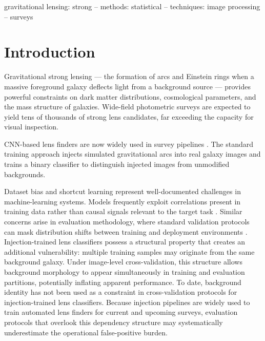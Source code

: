 \documentclass[fleqn,usenatbib]{mnras}
\begin{document}
\begin{keywords}
gravitational lensing: strong -- methods: statistical -- techniques:
image processing -- surveys
\end{keywords}

\section{Introduction}
\label{sec:intro}

Gravitational strong lensing --- the formation of arcs and Einstein rings
when a massive foreground galaxy deflects light from a background source
--- provides powerful constraints on dark matter distributions,
cosmological parameters, and the mass structure of galaxies. Wide-field
photometric surveys are expected to yield tens of thousands of strong lens
candidates, far exceeding the capacity for visual inspection.

CNN-based lens finders are now widely used in survey pipelines
\citep{lanusse2018,petrillo2019,metcalf2019}. The standard training
approach injects simulated gravitational arcs into real galaxy images and
trains a binary classifier to distinguish injected images from unmodified
backgrounds.

Dataset bias and shortcut learning represent well-documented challenges
in machine-learning systems. Models frequently exploit correlations
present in training data rather than causal signals relevant to the
target task \citep{torralba2011,geirhos2020}. Similar concerns arise in
evaluation methodology, where standard validation protocols can mask
distribution shifts between training and deployment environments
\citep{recht2019}. Injection-trained lens classifiers possess a
structural property that creates an additional vulnerability: multiple
training samples may originate from the same background galaxy. Under
image-level cross-validation, this structure allows background morphology
to appear simultaneously in training and evaluation partitions,
potentially inflating apparent performance. To date, background identity
has not been used as a constraint in cross-validation protocols for
injection-trained lens classifiers.
Because injection pipelines are widely used to train automated lens
finders for current and upcoming surveys, evaluation protocols that
overlook this dependency structure may systematically underestimate the
operational false-positive burden.
\end{document}
